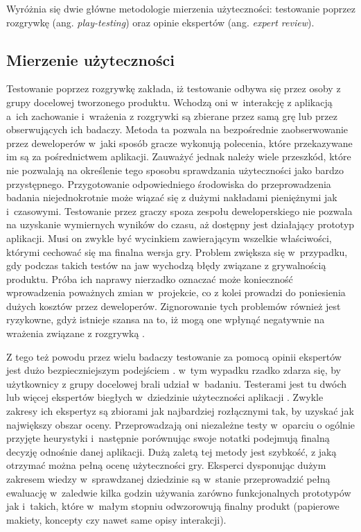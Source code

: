 \documentclass[a4paper,12pt,numbers=noenddot]{report}
\begin{document}
Wyróżnia się dwie główne metodologie mierzenia użyteczności: testowanie poprzez rozgrywkę (ang. \textit{play-testing}) oraz opinie ekspertów (ang. \textit{expert review}).

\subsection{Mierzenie użyteczności}
Testowanie poprzez rozgrywkę zakłada, iż testowanie odbywa się przez osoby z grupy docelowej tworzonego produktu\cite{art_evaluatingPlayabilityMG}. Wchodzą oni w~interakcję z aplikacją a~ich zachowanie i~wrażenia z rozgrywki są zbierane przez samą grę lub przez obserwujących ich badaczy. Metoda ta pozwala na bezpośrednie zaobserwowanie przez deweloperów w~jaki sposób gracze wykonują polecenia, które przekazywane im są za pośrednictwem aplikacji.
Zauważyć jednak należy wiele przeszkód, które nie pozwalają na określenie tego sposobu sprawdzania użyteczności jako bardzo przystępnego. Przygotowanie odpowiedniego środowiska do przeprowadzenia badania niejednokrotnie może wiązać się z dużymi nakładami pieniężnymi jak i~czasowymi. Testowanie przez graczy spoza zespołu deweloperskiego nie pozwala na uzyskanie wymiernych wyników do czasu, aż dostępny jest działający prototyp aplikacji. Musi on zwykle być wycinkiem zawierającym wszelkie właściwości, którymi cechować się ma finalna wersja gry. Problem zwiększa się w~przypadku, gdy podczas takich testów na jaw wychodzą błędy związane z grywalnością produktu. Próba ich naprawy nierzadko oznaczać może konieczność wprowadzenia poważnych zmian w~projekcie, co z kolei prowadzi do poniesienia dużych kosztów przez deweloperów. Zignorowanie tych problemów również jest ryzykowne, gdyż istnieje szansa na to, iż mogą one wpłynąć negatywnie na wrażenia związane z rozgrywką \cite{art_evaluationOfMG}.

Z tego też powodu przez wielu badaczy testowanie za pomocą opinii ekspertów jest dużo bezpieczniejszym podejściem \cite{art_UsabilityTestingComp}. w~tym wypadku rzadko zdarza się, by użytkownicy z grupy docelowej brali udział w~badaniu. Testerami jest tu dwóch lub więcej ekspertów biegłych w~dziedzinie użyteczności aplikacji \cite{art_Nielsen}. Zwykle zakresy ich ekspertyz są zbiorami jak najbardziej rozłącznymi tak, by uzyskać jak największy obszar oceny. Przeprowadzają oni niezależne testy w~oparciu o ogólnie przyjęte heurystyki i~następnie porównując swoje notatki podejmują finalną decyzję odnośnie danej aplikacji.
Dużą zaletą tej metody jest szybkość, z jaką otrzymać można pełną ocenę użyteczności gry. Eksperci dysponując dużym zakresem wiedzy w~sprawdzanej dziedzinie są w~stanie przeprowadzić pełną ewaluację w~zaledwie kilka godzin używania zarówno funkcjonalnych prototypów jak i~takich, które w~małym stopniu odwzorowują finalny produkt (papierowe makiety, koncepty czy nawet same opisy interakcji). 
\end{document}
